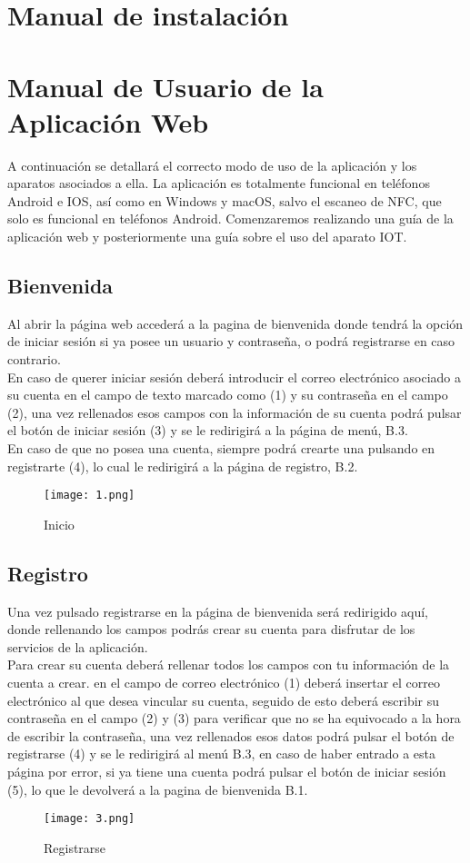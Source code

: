 \documentclass[12pt]{report}
\begin{document}
\begin{appendices}
\chapter{Manual de instalación}

\newpage
\chapter{Manual de Usuario de la Aplicación Web}
A continuación se detallará el correcto modo de uso de la aplicación y los aparatos asociados a ella.
La aplicación es totalmente funcional en teléfonos Android e IOS, así como en Windows y macOS, salvo el escaneo de NFC, que solo es funcional en teléfonos Android.
Comenzaremos realizando una guía de la aplicación web y posteriormente una guía sobre el uso del aparato IOT.

\section{Bienvenida}
Al abrir la página web accederá a la pagina de bienvenida donde tendrá la opción de iniciar sesión si ya posee un usuario y contraseña, o podrá registrarse en caso contrario.
\\En caso de querer iniciar sesión deberá introducir el correo electrónico asociado a su cuenta en el campo de texto marcado como (1) y su contraseña en el campo (2), una vez rellenados esos campos con la información de su cuenta podrá pulsar el botón de iniciar sesión (3) y se le redirigirá a la página de menú, B.3.
\\En caso de que no posea una cuenta, siempre podrá crearte una pulsando en registrarte (4), lo cual le redirigirá a la página de registro, B.2.
\begin{figure}[H]
    \centering
    \texttt{[image: 1.png]}
    \caption{Inicio}
    \label{fig:Figura3.4.3}
\end{figure}

\section{Registro}
Una vez pulsado registrarse en la página de bienvenida será redirigido aquí, donde rellenando los campos podrás crear su cuenta para disfrutar de los servicios de la aplicación.
\\Para crear su cuenta deberá rellenar todos los campos con tu información de la cuenta a crear. en el campo de correo electrónico (1) deberá insertar el correo electrónico al que desea vincular su cuenta, seguido de esto deberá escribir su contraseña en el campo (2) y (3) para verificar que no se ha equivocado a la hora de escribir la contraseña, una vez rellenados esos datos podrá pulsar el botón de registrarse (4) y se le redirigirá al menú B.3, en caso de haber entrado a esta página por error, si ya tiene una cuenta podrá pulsar el botón de iniciar sesión (5), lo que le devolverá a la pagina de bienvenida B.1.
\begin{figure}[H]
    \centering
    \texttt{[image: 3.png]}
    \caption{Registrarse}
    \label{fig:Figura3.4.3}
\end{figure}


\end{appendices}
\end{document}

